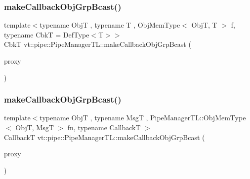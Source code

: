 \subsubsection{\texorpdfstring{make\+Callback\+Obj\+Grp\+Bcast()}{makeCallbackObjGrpBcast()}\hspace{0.1cm}{\footnotesize\ttfamily [1/2]}}
{\footnotesize\ttfamily template$<$typename ObjT , typename T , Obj\+Mem\+Type$<$ Obj\+T, T $>$ f, typename CbkT  = Def\+Type$<$\+T$>$$>$ \\
CbkT vt\+::pipe\+::\+Pipe\+Manager\+T\+L\+::make\+Callback\+Obj\+Grp\+Bcast (\begin{DoxyParamCaption}\item[{\hyperlink{structvt_1_1objgroup_1_1proxy_1_1_proxy}{objgroup\+::proxy\+::\+Proxy}$<$ ObjT $>$}]{proxy }\end{DoxyParamCaption})}

\mbox{\label{structvt_1_1pipe_1_1_pipe_manager_t_l_a9caf63b8c6577acd4884933c1b9cc886}} 
\subsubsection{\texorpdfstring{make\+Callback\+Obj\+Grp\+Bcast()}{makeCallbackObjGrpBcast()}\hspace{0.1cm}{\footnotesize\ttfamily [2/2]}}
{\footnotesize\ttfamily template$<$typename ObjT , typename MsgT , Pipe\+Manager\+T\+L\+::\+Obj\+Mem\+Type$<$ Obj\+T, Msg\+T $>$ fn, typename CallbackT $>$ \\
CallbackT vt\+::pipe\+::\+Pipe\+Manager\+T\+L\+::make\+Callback\+Obj\+Grp\+Bcast (\begin{DoxyParamCaption}\item[{\hyperlink{structvt_1_1objgroup_1_1proxy_1_1_proxy}{objgroup\+::proxy\+::\+Proxy}$<$ ObjT $>$}]{proxy }\end{DoxyParamCaption})}

\mbox{\label{structvt_1_1pipe_1_1_pipe_manager_t_l_a98f92fd3f75e48766b55c7b7253c19b4}} 
